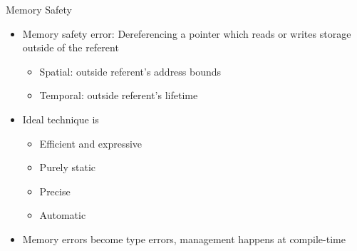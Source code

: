 \documentclass[aspectratio=169]{beamer}
\begin{document}
\begin{frame}{Memory Safety}
\begin{itemize}[<+->]
    \item Memory safety error: Dereferencing a pointer which reads or writes storage outside of the referent
        \begin{itemize}
            \item Spatial: outside referent's \alert{address bounds}
            \item Temporal: outside referent's \alert{lifetime}
        \end{itemize}
    \item Ideal technique is
        \begin{itemize}
            \item Efficient and expressive %
            \item Purely static %
            \item Precise %
            \item Automatic %
        \end{itemize}
    \item Memory errors become \alert{type errors}, management happens at \alert{compile-time}
\end{itemize}
\end{frame}


\end{document}
